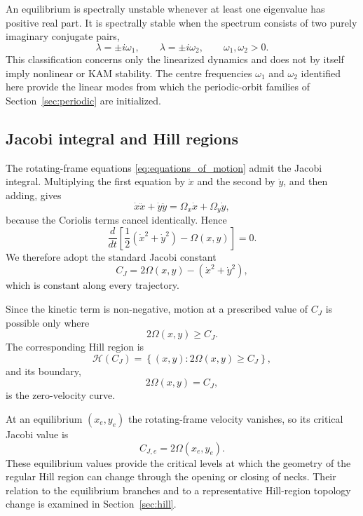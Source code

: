 An equilibrium is spectrally unstable whenever at least one eigenvalue has
positive real part. It is spectrally stable when the spectrum consists of
two purely imaginary conjugate pairs,
\[
\lambda=\pm i\omega_1,
\qquad
\lambda=\pm i\omega_2,
\qquad
\omega_1,\omega_2>0.
\]
This classification concerns only the linearized dynamics and does not by
itself imply nonlinear or KAM stability. The centre frequencies
$\omega_1$ and $\omega_2$ identified here provide the linear modes from
which the periodic-orbit families of Section~\ref{sec:periodic} are initialized.


\subsection{Jacobi integral and Hill regions}
\label{subsec:jacobi}

The rotating-frame equations \eqref{eq:equations_of_motion} admit the
Jacobi integral. Multiplying the first equation by $\dot{x}$ and the second
by $\dot{y}$, and then adding, gives
\[
\dot{x}\ddot{x}+\dot{y}\ddot{y}
=
\Omega_x\dot{x}+\Omega_y\dot{y},
\]
because the Coriolis terms cancel identically. Hence
\[
\frac{d}{dt}
\left[
\frac{1}{2}\left(\dot{x}^2+\dot{y}^2\right)-\Omega(x,y)
\right]
=0.
\]
We therefore adopt the standard Jacobi constant
\begin{equation}
C_J
=
2\Omega(x,y)
-
\left(\dot{x}^2+\dot{y}^2\right),
\label{eq:jacobi_integral}
\end{equation}
which is constant along every trajectory.

Since the kinetic term is non-negative, motion at a prescribed value of
$C_J$ is possible only where
\begin{equation}
2\Omega(x,y)\geq C_J.
\label{eq:hill_condition}
\end{equation}
The corresponding Hill region is
\begin{equation}
\mathcal H(C_J)
=
\left\{
(x,y):2\Omega(x,y)\geq C_J
\right\},
\label{eq:hill_region}
\end{equation}
and its boundary,
\begin{equation}
2\Omega(x,y)=C_J,
\label{eq:zero_velocity_curve}
\end{equation}
is the zero-velocity curve.

At an equilibrium $(x_e,y_e)$ the rotating-frame velocity vanishes, so its
critical Jacobi value is
\begin{equation}
C_{J,e}
=
2\Omega(x_e,y_e).
\label{eq:critical_jacobi}
\end{equation}
These equilibrium values provide the critical levels at which the geometry
of the regular Hill region can change through the opening or closing of
necks. Their relation to the equilibrium branches and to a representative
Hill-region topology change is examined in Section~\ref{sec:hill}.